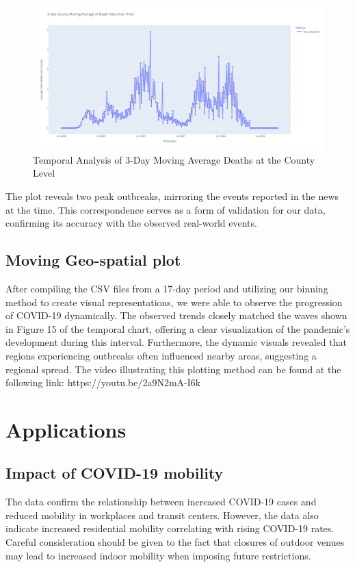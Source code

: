 \documentclass[sigconf,screen,nonacm]{acmart}
\begin{document}
\begin{figure}[H]
  \centering
  \includegraphics[width=\linewidth]{Figures/Temporal3daymovingaverageDeaths.png}
  \caption{Temporal Analysis of 3-Day Moving Average Deaths at the County Level}
  \label{fig:temporal_3day_moving_average_deaths}
\end{figure}
\noindent
The plot reveals two peak outbreaks, mirroring the events reported in the news at the time. This correspondence serves as a form of validation for our data, confirming its accuracy with the observed real-world events.
\subsection{Moving Geo-spatial plot}
After compiling the CSV files from a 17-day period and utilizing our binning method to create visual representations, we were able to observe the progression of COVID-19 dynamically. The observed trends closely matched the waves shown in Figure 15 of the temporal chart, offering a clear visualization of the pandemic's development during this interval. Furthermore, the dynamic visuals revealed that regions experiencing outbreaks often influenced nearby areas, suggesting a regional spread. The video illustrating this plotting method can be found at the following link: https://youtu.be/2a9N2mA-I6k


\section{Applications}


\subsection{Impact of COVID-19 mobility}
The data confirm the relationship between increased COVID-19 cases and reduced mobility in workplaces and transit centers. However, the data also indicate increased residential mobility correlating with rising COVID-19 rates. Careful consideration should be given to the fact that closures of outdoor venues may lead to increased indoor mobility when imposing future restrictions.
\end{document}
